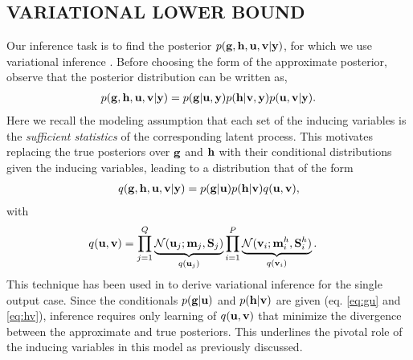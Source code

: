 \subsection{VARIATIONAL LOWER BOUND \label{sec:variationalLowerBound}}
\newcommand{\ug}{\u_g}
\newcommand{\uh}{\u^h}
\newcommand{\mgj}{\m_j}
\newcommand{\mhi}{\m^h_i}
\newcommand{\Sgj}{\S_j}
\newcommand{\Shi}{\S^h_i}
Our inference task is to find the posterior $p(\mathbf{g}, \mathbf{h}, \mathbf{u}, \mathbf{v} | \mathbf{y})$, for which we use variational inference \citep{jordan-variational-99}. 
Before choosing the form of the approximate posterior, observe that the posterior distribution can be written as,
\begin{align}
p(\mathbf{g}, \mathbf{h}, \mathbf{u}, \mathbf{v} | \mathbf{y}) = p(\mathbf{g} | \mathbf{u}, \mathbf{y}) p(\mathbf{h} | \mathbf{v}, \mathbf{y}) p(\mathbf{u}, \mathbf{v} | \mathbf{y}).
\end{align}
Here we recall the modeling assumption that each set of the inducing variables is the \emph{sufficient statistics} of the corresponding latent process. 
This motivates replacing the true posteriors over $\mathbf{g}$ and $\mathbf{h}$ with their conditional distributions given the inducing variables, leading to a distribution that of the form
\begin{align}
q(\mathbf{g}, \mathbf{h}, \mathbf{u}, \mathbf{v} | \mathbf{y})
= p(\mathbf{g}|\mathbf{u}) p(\mathbf{h}|\mathbf{v}) q(\mathbf{u},\mathbf{v}),
\end{align}
with
\begin{align}
q(\u,\v) &= \prod_{j=1}^Q \underbrace{\Normal(\u_j; \mgj, \Sgj)}_{q(\u_j)} \prod_{i=1}^P  \underbrace{\Normal(\v_i; \mhi, \Shi)}_{q(\v_i)}.
\end{align}
This technique has been used in \citep{titsiasvariational,hensmangaussian} to derive variational inference for the single output case.
Since the conditionals $p(\mathbf{g} | \mathbf{u})$ and $p(\mathbf{h} | \mathbf{v})$ are given (eq. \ref{eq:gu} and \ref{eq:hv}), inference requires only learning of $q(\mathbf{u}, \mathbf{v})$ that minimize the divergence between the approximate and true posteriors.
This underlines the pivotal role of the inducing variables in this model as previously discussed.

